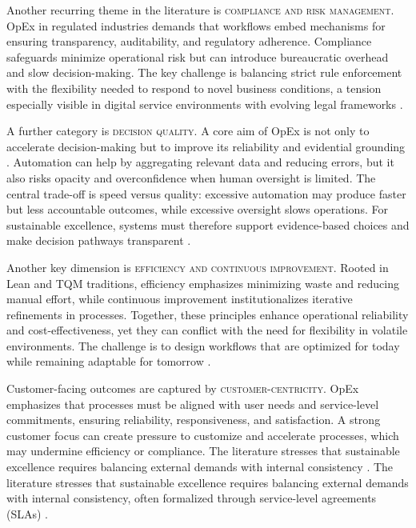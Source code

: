 Another recurring theme in the literature is \textsc{compliance and risk management}. OpEx in regulated industries demands that workflows embed mechanisms for ensuring transparency, auditability, and regulatory adherence. Compliance safeguards minimize operational risk but can introduce bureaucratic overhead and slow decision-making. The key challenge is balancing strict rule enforcement with the flexibility needed to respond to novel business conditions, a tension especially visible in digital service environments with evolving legal frameworks \parencite[cf.][p. 687]{owoadeSystematic2024}.

A further category is \textsc{decision quality}. A core aim of OpEx is not only to accelerate decision-making but to improve its reliability and evidential grounding \parencite[cf.][p. 685]{owoadeSystematic2024}. Automation can help by aggregating relevant data and reducing errors, but it also risks opacity and overconfidence when human oversight is limited. The central trade-off is speed versus quality: excessive automation may produce faster but less accountable outcomes, while excessive oversight slows operations. For sustainable excellence, systems must therefore support evidence-based choices and make decision pathways transparent \parencite{carvalhoOperational2023}.

Another key dimension is \textsc{efficiency and continuous improvement}. Rooted in Lean and TQM traditions, efficiency emphasizes minimizing waste and reducing manual effort, while continuous improvement institutionalizes iterative refinements in processes. Together, these principles enhance operational reliability and cost-effectiveness, yet they can conflict with the need for flexibility in volatile environments. The challenge is to design workflows that are optimized for today while remaining adaptable for tomorrow \parencite[cf.][p. 14.16 \& p. 8.1]{juranQuality1999}.

Customer-facing outcomes are captured by \textsc{customer-centricity}. OpEx emphasizes that processes must be aligned with user needs and service-level commitments, ensuring reliability, responsiveness, and satisfaction. A strong customer focus can create pressure to customize and accelerate processes, which may undermine efficiency or compliance. The literature stresses that sustainable excellence requires balancing external demands with internal consistency \parencite{womackLean1997,juranQuality1999}. The literature stresses that sustainable excellence requires balancing external demands with internal consistency, often formalized through service-level agreements (SLAs) \parencite[cf.][p. 115]{duanData2015}.

